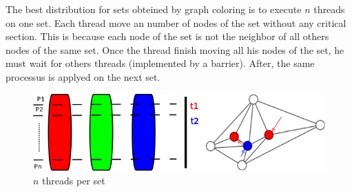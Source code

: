 The best distribution for sets obteined by graph coloring is to execute $n$ threads on one set. Each thread move an number of nodes of the set without any critical section. This is because each node of the set is not the neighbor of all others nodes of the same set. Once the thread finish moving all his nodes of the set, he must wait for others threads (implemented by a barrier). After, the same processus is applyed on the next set.

\begin{figure}[!h]
\centering
\includegraphics[scale=0.5]{img/distrib.png}
\caption{$n$ threads per set}
\end{figure}



